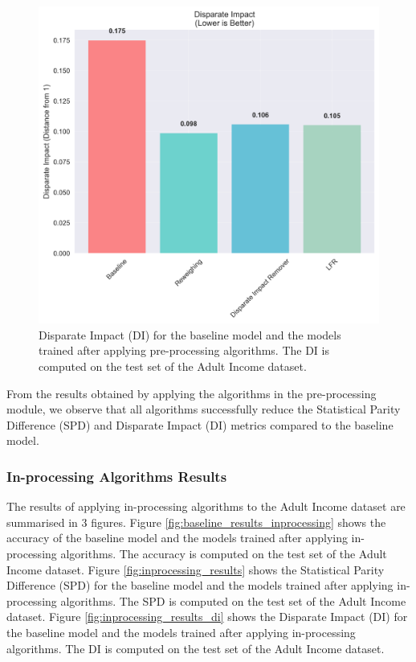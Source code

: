 \documentclass[12pt,a4paper,openright,twoside]{book}
\begin{document}
\begin{figure}
    \centering
    \includegraphics[width=\textwidth]{figures/preprocessing_results/di_comparison_chart.png}
    \caption{Disparate Impact (DI) for the baseline model and the models trained after applying pre-processing algorithms. The DI is computed on the test set of the Adult Income dataset.}
    \label{fig:preprocessing_results_di}
\end{figure}

From the results obtained by applying the algorithms in the pre-processing module, we observe that all algorithms successfully reduce the Statistical Parity Difference (SPD) and Disparate Impact (DI) metrics compared to the baseline model.

\subsubsection{In-processing Algorithms Results}

The results of applying in-processing algorithms to the Adult Income dataset are summarised in 3 figures. Figure \ref{fig:baseline_results_inprocessing} shows the accuracy of the baseline model and the models trained after applying in-processing algorithms. The accuracy is computed on the test set of the Adult Income dataset.
Figure \ref{fig:inprocessing_results} shows the Statistical Parity Difference (SPD) for the baseline model and the models trained after applying in-processing algorithms. The SPD is computed on the test set of the Adult Income dataset. Figure \ref{fig:inprocessing_results_di} shows the Disparate Impact (DI) for the baseline model and the models trained after applying in-processing algorithms. The DI is computed on the test set of the Adult Income dataset.
\end{document}
